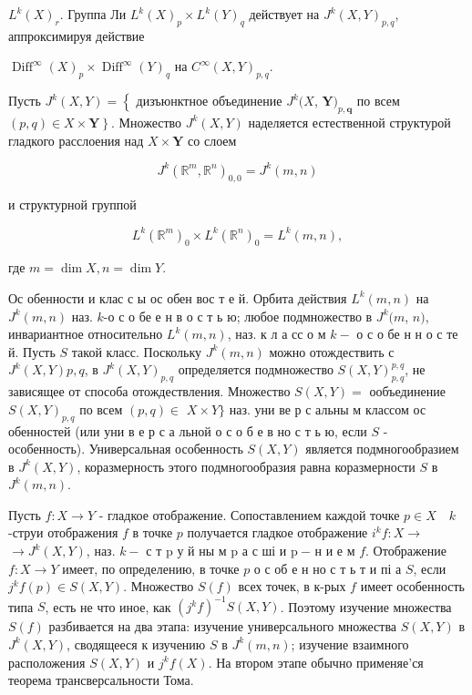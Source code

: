 \documentclass[10pt]{article}
\begin{document}
$L^{k}(X)_{r}$. Группа Ли $L^{k}(X)_{p} \times L^{k}(Y)_{q}$ действует на $J^{k}(X, Y)_{p, q}$, аппроксимируя действие



$\operatorname{Diff}^{\infty}(X)_{p} \times \operatorname{Diff}^{\infty}(Y)_{q}$ на $C^{\infty}(X, Y)_{p, q}$.



Пусть $J^{k}(X, Y)=\left\{\right.$ дизъюнктное объединение $J^{k}(X$, $\boldsymbol{Y})_{p, \boldsymbol{q}}$ по всем $\left.(p, q) \in X \times \boldsymbol{Y}\right\}$. Множество $J^{k}(X, Y)$ наделяется естественной структурой гладкого расслоения над $X \times \boldsymbol{Y}$ со слоем



\[

J^{k}\left(\mathbb{R}^{m}, \mathbb{R}^{n}\right)_{0,0}=J^{k}(m, n)

\]



и структурной группой



\[

L^{k}\left(\mathbb{R}^{m}\right)_{0} \times L^{k}\left(\mathbb{R}^{n}\right)_{0}=L^{k}(m, n),

\]



где $m=\operatorname{dim} X, n=\operatorname{dim} Y$.



Ос обенности и клас с ы ос обен вос т е й. Орбита действия $L^{k}(m, n)$ на $J^{k}(m, n)$ наз. $k$-о с о бе е н в о с т ь ю; любое подмножество в $J^{k}(m$, $n)$, инвариантное относительно $L^{k}(m, n)$, наз. к л а сс о м $k-$ о с о бе н н о с те й. Пусть $S$ такой класс. Поскольку $J^{k}(m, n)$ можно отождествить с $J^{k}(X, Y) p, q$, в $J^{k}(X, Y)_{p, q}$ определяется подмножество $S(X, Y)_{p, q}^{p, q}$, не зависящее от способа отождествления. Множество $S(X, Y)=$ ообъединение $S(X, Y)_{p, q}$ по всем $(p, q) \in$ $X \times Y\}$ наз. уни ве р с альны м классом ос обенностей (или уни в е р с а льной о с о б е в но с т ь ю, если $S$ - особенность). Универсальная особенность $S(X, Y)$ является подмногообразием в $J^{k}(X, Y)$, коразмерность этого подмногообразия равна коразмерности $S$ в $J^{k}(m, n)$.



Пусть $f: X \rightarrow Y$ - гладкое отображение. Сопоставлением каждой точке $p \in X \quad k$-струи отображения $f$ в точке $p$ получается гладкое отображение $i^{k} f: X \rightarrow$ $\rightarrow J^{k}(X, Y)$, наз. $k-$ с т $\mathrm{p}$ у й ны м $\mathrm{p}$ а с ші и $\mathrm{p} \mathbf{~} \mathbf{-}$ н и е м $f$. Отображение $f: X \rightarrow Y$ имеет, по определению, в точке $p$ о с об е н но с т ь т и пі а $S$, если $j^{k} f(p) \in S(X, Y)$. Множество $S(f)$ всех точек, в к-рых $f$ имеет особенность типа $S$, есть не что иное, как $\left(j^{k} f\right)^{-1} S(X, Y)$. Поэтому изучение множества $S(f)$ разбивается на два этапа: изучение универсального множества $S(X, Y)$ в $J^{k}(X, Y)$, сводящееся к изучению $S$ в $J^{k}(m, n)$; изучение взаимного расположения $S(X, Y)$ и $j^{k} f(X)$. На втором этапе обычно применяе'ся теорема трансверсальности Тома.
\end{document}
